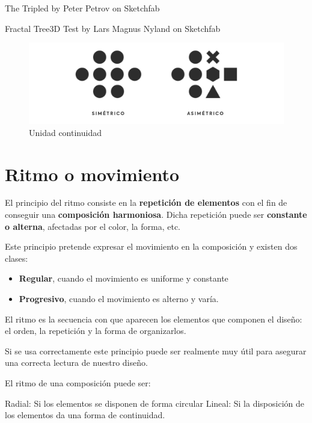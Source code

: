 \documentclass[16pt,]{krantz}
\providecommand{\tightlist}{%
  \setlength{\itemsep}{0pt}\setlength{\parskip}{0pt}}
\theoremstyle{definition}
\theoremstyle{definition}
\theoremstyle{definition}
\theoremstyle{definition}
\theoremstyle{remark}
\begin{document}
The Tripled by Peter Petrov on Sketchfab

Fractal Tree3D Test by Lars Magnus Nyland on Sketchfab

\begin{figure}

{\centering \includegraphics[width=1\linewidth,height=1\textheight]{equilibrio} 

}

\caption{Unidad continuidad}\label{fig:equilibrio}
\end{figure}

\hypertarget{ritmo-o-movimiento}{%
\section{Ritmo o movimiento}\label{ritmo-o-movimiento}}

El principio del ritmo consiste en la \textbf{repetición de elementos} con el fin de conseguir una \textbf{composición harmoniosa}. Dicha repetición puede ser \textbf{constante o alterna}, afectadas por el color, la forma, etc.

Este principio pretende expresar el movimiento en la composición y existen dos clases:

\begin{itemize}
\tightlist
\item
  \textbf{Regular}, cuando el movimiento es uniforme y constante
\item
  \textbf{Progresivo}, cuando el movimiento es alterno y varía.
\end{itemize}

El ritmo es la secuencia con que aparecen los elementos que componen el diseño: el orden, la repetición y la forma de organizarlos.

Si se usa correctamente este principio puede ser realmente muy útil para asegurar una correcta lectura de nuestro diseño.

El ritmo de una composición puede ser:

Radial: Si los elementos se disponen de forma circular Lineal: Si la disposición de los elementos da una forma de continuidad.
\end{document}
